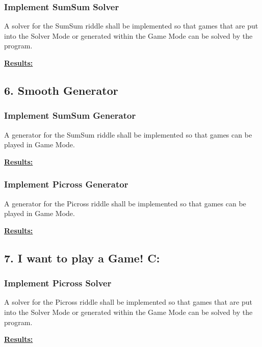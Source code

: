 \documentclass{article}
\begin{document}
	\subsubsection*{Implement SumSum Solver}
	
	A solver for the SumSum riddle shall be implemented so that games that are put into the Solver Mode or generated within the Game Mode can be solved by the program.
	
	\begin{framed}
		\textbf{\underline{Results:}}\\
	\end{framed}
	
	\newpage
	
	\subsection*{6. Smooth Generator}
	
	\subsubsection*{Implement SumSum Generator}
	
	A generator for the SumSum riddle shall be implemented so that games can be played in Game Mode.
	
	\begin{framed}
		\textbf{\underline{Results:}}\\
	\end{framed}
	
	\subsubsection*{Implement Picross Generator}
	
	A generator for the Picross riddle shall be implemented so that games can be played in Game Mode.
	
	\begin{framed}
		\textbf{\underline{Results:}}\\
	\end{framed}

	\newpage
	
	\subsection*{7. I want to play a Game! C:}	
	
	\subsubsection*{Implement Picross Solver}
	
	A solver for the Picross riddle shall be implemented so that games that are put into the Solver Mode or generated within the Game Mode can be solved by the program.
	
	\begin{framed}
		\textbf{\underline{Results:}}\\
	\end{framed}
	
	\newpage
		
\end{document}

